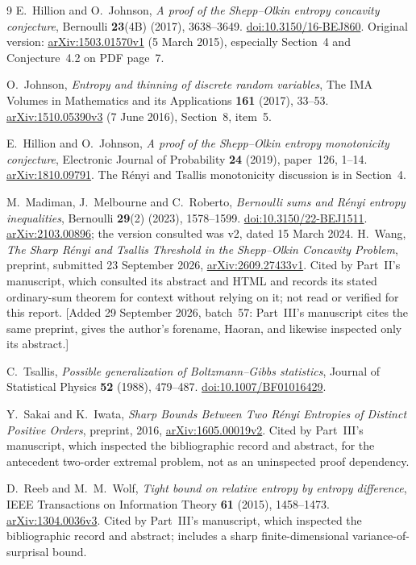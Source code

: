 \documentclass[11pt]{article}
\numberwithin{equation}{section}
\theoremstyle{definition}
\theoremstyle{remark}
\begin{document}
\begin{thebibliography}{9}
E.~Hillion and O.~Johnson,
\emph{A proof of the Shepp--Olkin entropy concavity conjecture},
Bernoulli \textbf{23}(4B) (2017), 3638--3649.
\href{https://doi.org/10.3150/16-BEJ860}{doi:10.3150/16-BEJ860}.
Original version: \href{https://arxiv.org/abs/1503.01570}{arXiv:1503.01570v1}
(5 March 2015), especially Section~4 and Conjecture~4.2 on PDF page~7.

O.~Johnson,
\emph{Entropy and thinning of discrete random variables},
The IMA Volumes in Mathematics and its Applications \textbf{161} (2017),
33--53.
\href{https://arxiv.org/abs/1510.05390}{arXiv:1510.05390v3}
(7 June 2016), Section~8, item~5.

E.~Hillion and O.~Johnson,
\emph{A proof of the Shepp--Olkin entropy monotonicity conjecture},
Electronic Journal of Probability \textbf{24} (2019), paper~126, 1--14.
\href{https://arxiv.org/abs/1810.09791}{arXiv:1810.09791}.
The R\'enyi and Tsallis monotonicity discussion is in Section~4.

M.~Madiman, J.~Melbourne and C.~Roberto,
\emph{Bernoulli sums and R\'enyi entropy inequalities},
Bernoulli \textbf{29}(2) (2023), 1578--1599.
\href{https://doi.org/10.3150/22-BEJ1511}{doi:10.3150/22-BEJ1511}.
\href{https://arxiv.org/abs/2103.00896}{arXiv:2103.00896}; the version consulted
was v2, dated 15 March 2024.
H.~Wang,
\emph{The Sharp R\'enyi and Tsallis Threshold in the Shepp--Olkin
Concavity Problem}, preprint, submitted 23 September 2026,
\href{https://arxiv.org/abs/2609.27433v1}{arXiv:2609.27433v1}.
Cited by Part~II's manuscript, which consulted its abstract and HTML and
records its stated ordinary-sum theorem for context without relying on it;
not read or verified for this report.
[Added 29 September 2026, batch~57: Part~III's manuscript cites the same
preprint, gives the author's forename, Haoran, and likewise inspected
only its abstract.]

C.~Tsallis,
\emph{Possible generalization of Boltzmann--Gibbs statistics},
Journal of Statistical Physics \textbf{52} (1988), 479--487.
\href{https://doi.org/10.1007/BF01016429}{doi:10.1007/BF01016429}.

Y.~Sakai and K.~Iwata,
\emph{Sharp Bounds Between Two R\'enyi Entropies of Distinct Positive
Orders}, preprint, 2016,
\href{https://arxiv.org/abs/1605.00019}{arXiv:1605.00019v2}.
Cited by Part~III's manuscript, which inspected the bibliographic record
and abstract, for the antecedent two-order extremal problem, not as an
uninspected proof dependency.

D.~Reeb and M.~M.~Wolf,
\emph{Tight bound on relative entropy by entropy difference},
IEEE Transactions on Information Theory \textbf{61} (2015), 1458--1473.
\href{https://arxiv.org/abs/1304.0036}{arXiv:1304.0036v3}.
Cited by Part~III's manuscript, which inspected the bibliographic record
and abstract; includes a sharp finite-dimensional variance-of-surprisal
bound.
\end{thebibliography}
\end{document}
